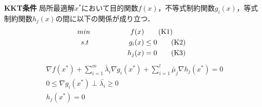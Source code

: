 \documentclass[a4j,10.5pt,fleqn]{jarticle}
\begin{document}
\begin{itembox}[l]{\bf{KKT条件}}
	局所最適解$x^*$において目的関数$f(x)$，不等式制約関数$g_i(x)$，等式制約関数$h_j(x)$の間に以下の関係が成り立つ．\\
	\begin{align}
	min\hspace{20mm}f(x)&\label{K1}\tag{K1}\\
	s.t \hspace{20mm}g_i(x)&\le 0\label{K2}\tag{K2}\\
	h_j(x)&=0\label{K3}\tag{K3}
	\end{align}
	\begin{align}
	&\nabla f(x^*)+ \sum_{i=1}^m \bar{\lambda}_i \nabla g_i(x^*) + \sum_{i=1}^l \bar{\mu}_j \nabla h_j(x^*)=0\label{K4}\tag{K4}\\
	&0\le\nabla g_i(x^*)\perp\bar{\lambda_i}\geq0\label{K5}\tag{K5}\\
	&h_j(x^*)=0\label{K6}\tag{K6}
	\end{align}
\end{itembox}
\end{document}

